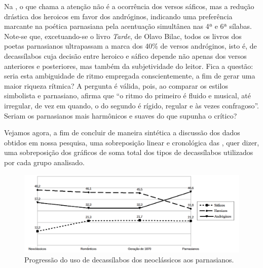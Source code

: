 \documentclass[portuguese]{textolivre}
\begin{document}
Na , o que chama a atenção não é a ocorrência dos versos sáficos, mas a redução drástica dos heroicos em favor dos andróginos, indicando uma preferência marcante na poética parnasiana pela acentuação simultânea nas 4ª e 6ª sílabas. Note-se que, excetuando-se o livro \textit{Tarde}, de Olavo Bilac, todos os livros dos poetas parnasianos ultrapassam a marca dos 40\% de versos andróginos, isto é, de decassílabos cuja decisão entre heroico e sáfico depende não apenas dos versos anteriores e posteriores, mas também da subjetividade do leitor. Fica a questão: seria esta ambiguidade de ritmo empregada conscientemente, a fim de gerar uma maior riqueza rítmica? A pergunta é válida, pois, ao comparar os estilos simbolista e parnasiano, \textcite[p.~28]{ramos1965poesia} afirma que “o ritmo do primeiro é fluido e musical, até irregular, de vez em quando, o do segundo é rígido, regular e às vezes confragoso”. Seriam os parnasianos mais harmônicos e suaves do que supunha o crítico?

Vejamos agora, a fim de concluir de maneira sintética a discussão dos dados obtidos em nossa pesquisa, uma sobreposição linear e cronológica das , quer dizer, uma sobreposição dos gráficos de soma total dos tipos de decassílabos utilizados por cada grupo analisado.

\begin{figure}[!h]
    \centering
    \begin{minipage}{0.85\linewidth}
    \includegraphics[width=\linewidth]{fig-006.pdf}
    \caption{Progressão do uso de decassílabos dos neoclássicos aos parnasianos.}
    \label{fig6}
    \end{minipage}
\end{figure}
\end{document}
